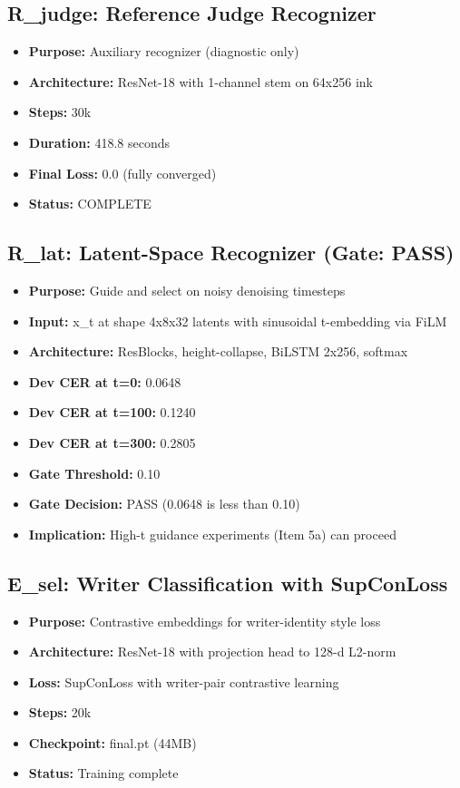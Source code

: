 \documentclass[12pt,a4paper]{article}
\begin{document}
\subsection{R\_judge: Reference Judge Recognizer}

\begin{itemize}
  \item \textbf{Purpose:} Auxiliary recognizer (diagnostic only)
  \item \textbf{Architecture:} ResNet-18 with 1-channel stem on 64x256 ink
  \item \textbf{Steps:} 30k
  \item \textbf{Duration:} 418.8 seconds
  \item \textbf{Final Loss:} 0.0 (fully converged)
  \item \textbf{Status:} COMPLETE
\end{itemize}

\subsection{R\_lat: Latent-Space Recognizer (Gate: PASS)}

\begin{itemize}
  \item \textbf{Purpose:} Guide and select on noisy denoising timesteps
  \item \textbf{Input:} x\_t at shape 4x8x32 latents with sinusoidal t-embedding via FiLM
  \item \textbf{Architecture:} ResBlocks, height-collapse, BiLSTM 2x256, softmax
  \item \textbf{Dev CER at t=0:} 0.0648
  \item \textbf{Dev CER at t=100:} 0.1240
  \item \textbf{Dev CER at t=300:} 0.2805
  \item \textbf{Gate Threshold:} 0.10
  \item \textbf{Gate Decision:} PASS (0.0648 is less than 0.10)
  \item \textbf{Implication:} High-t guidance experiments (Item 5a) can proceed
\end{itemize}

\subsection{E\_sel: Writer Classification with SupConLoss}

\begin{itemize}
  \item \textbf{Purpose:} Contrastive embeddings for writer-identity style loss
  \item \textbf{Architecture:} ResNet-18 with projection head to 128-d L2-norm
  \item \textbf{Loss:} SupConLoss with writer-pair contrastive learning
  \item \textbf{Steps:} 20k
  \item \textbf{Checkpoint:} final.pt (44MB)
  \item \textbf{Status:} Training complete
\end{itemize}
\end{document}
